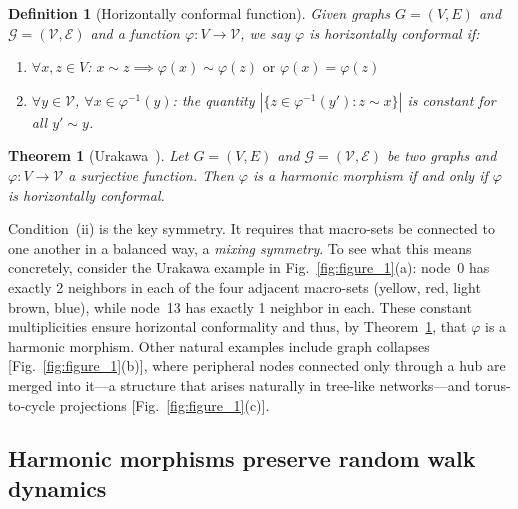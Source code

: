 \documentclass[twocolumn,superscriptaddress,tightenlines,aps,prx,floatfix]{revtex4-2}
\newtheorem{theorem}{Theorem}
\newtheorem{definition}{Definition}
\begin{document}
\begin{bibunit}
\begin{definition}[Horizontally conformal function]
\label{def:horizontal_conformal}
Given graphs $G=(V,E)$ and $\mathcal{G}=(\mathcal{V},\mathcal{E})$ and a function $\varphi: V \rightarrow \mathcal{V}$, we say $\varphi$ is \emph{horizontally conformal} if:
\begin{enumerate}
\item[(i)] $\forall x,z \in V$: $x \sim z \implies \varphi(x) \sim \varphi(z) \text{ or } \varphi(x)=\varphi(z)$

\item[(ii)] $\forall y \in \mathcal{V}$, $\forall x \in \varphi^{-1}(y)$: the quantity $|\{ z\in \varphi^{-1}(y') : z \sim x \}|$ is constant for all $y' \sim y$.
\end{enumerate}
\end{definition}

\begin{theorem}[Urakawa~\cite{Urakawa_Harmonic_morphisms_2000}]
\label{thm:urakawa}
Let $G=(V,E)$ and $\mathcal{G}=(\mathcal{V},\mathcal{E})$ be two graphs and $\varphi: V \rightarrow \mathcal{V}$ a surjective function. Then $\varphi$ is a harmonic morphism if and only if $\varphi$ is horizontally conformal.
\end{theorem}

Condition~(ii) is the key symmetry. It requires that macro-sets be connected to one another in a balanced way, a \emph{mixing symmetry}. To see what this means concretely, consider the Urakawa example in Fig.~\ref{fig:figure_1}(a): node~0 has exactly 2 neighbors in each of the four adjacent macro-sets (yellow, red, light brown, blue), while node~13 has exactly 1 neighbor in each. These constant multiplicities ensure horizontal conformality and thus, by Theorem~\ref{thm:urakawa}, that $\varphi$ is a harmonic morphism. Other natural examples include graph collapses [Fig.~\ref{fig:figure_1}(b)], where peripheral nodes connected only through a hub are merged into it---a structure that arises naturally in tree-like networks---and torus-to-cycle projections [Fig.~\ref{fig:figure_1}(c)].


\subsection{Harmonic morphisms preserve random walk dynamics}


\end{bibunit}
\end{document}
